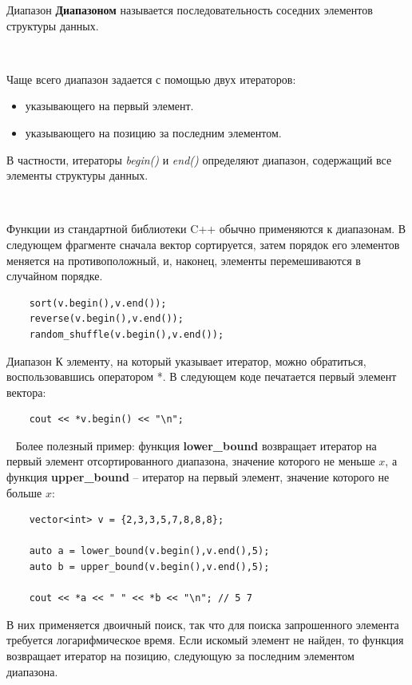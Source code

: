 \documentclass{beamer}
\begin{document}
\begin{frame}[fragile]{Диапазон}
    \textbf{Диапазоном} называется последовательность соседних элементов структуры данных. 
    
    ~
    
    Чаще всего диапазон задается с помощью двух итераторов:
    \begin{itemize}
        \item указывающего на первый элемент.
        \item указывающего на позицию за последним элементом.
    \end{itemize}

    В частности, итераторы \textit{begin()} и \textit{end()} определяют диапазон, содержащий все элементы структуры данных.

    ~
    
    Функции из стандартной библиотеки C++ обычно применяются к диапазонам. В следующем фрагменте сначала вектор сортируется, затем порядок его элементов меняется на противоположный, и, наконец, элементы перемешиваются в случайном порядке.

	\begin{verbatim}
    sort(v.begin(),v.end());
    reverse(v.begin(),v.end());
    random_shuffle(v.begin(),v.end());
	\end{verbatim}
\end{frame}

\begin{frame}[fragile]{Диапазон}
    К элементу, на который указывает итератор, можно обратиться, воспользовавшись оператором *. В следующем коде печатается первый элемент вектора:
    \begin{verbatim}
    cout << *v.begin() << "\n";
    \end{verbatim}
    
    ~
    Более полезный пример: функция \textbf{lower\_bound} возвращает итератор на
первый элемент отсортированного диапазона, значение которого не меньше $x$, а функция \textbf{upper\_bound} -- итератор на первый элемент, значение которого не больше $x$:

    \begin{verbatim}
    vector<int> v = {2,3,3,5,7,8,8,8};
    
    auto a = lower_bound(v.begin(),v.end(),5);
    auto b = upper_bound(v.begin(),v.end(),5);

    cout << *a << " " << *b << "\n"; // 5 7
    \end{verbatim}

    В них применяется двоичный поиск, так что для поиска запрошенного элемента требуется логарифмическое время. Если искомый элемент не найден, то функция возвращает итератор на позицию, следующую за последним элементом диапазона.
\end{frame}
\end{document}
